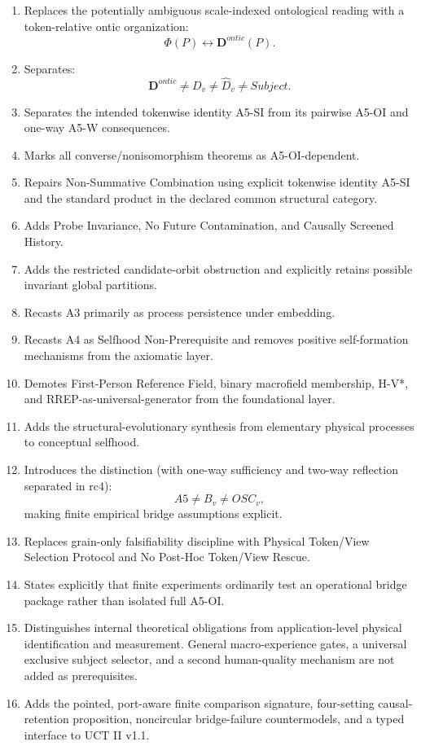 \documentclass[
  11pt,
  a4paper,
]{article}
\begin{document}
\begin{enumerate}
\def\labelenumi{\arabic{enumi}.}
\item
  Replaces the potentially ambiguous scale-indexed ontological reading
  with a token-relative ontic organization: \[
  \Phi(P)\leftrightarrow\mathbf D^{ontic}(P).
  \]
\item
  Separates: \[
  \mathbf D^{ontic}
  \neq
  D_v
  \neq
  \widehat D_v
  \neq
  Subject.
  \]
\item
  Separates the intended tokenwise identity A5-SI from its pairwise
  A5-OI and one-way A5-W consequences.
\item
  Marks all converse/nonisomorphism theorems as A5-OI-dependent.
\item
  Repairs Non-Summative Combination using explicit tokenwise identity
  A5-SI and the standard product in the declared common structural
  category.
\item
  Adds Probe Invariance, No Future Contamination, and Causally Screened
  History.
\item
  Adds the restricted candidate-orbit obstruction and explicitly retains
  possible invariant global partitions.
\item
  Recasts A3 primarily as process persistence under embedding.
\item
  Recasts A4 as Selfhood Non-Prerequisite and removes positive
  self-formation mechanisms from the axiomatic layer.
\item
  Demotes First-Person Reference Field, binary macrofield membership,
  H-V*, and RREP-as-universal-generator from the foundational layer.
\item
  Adds the structural-evolutionary synthesis from elementary physical
  processes to conceptual selfhood.
\item
  Introduces the distinction (with one-way sufficiency and two-way
  reflection separated in rc4): \[
  A5
  \neq
  B_v
  \neq
  OSC_v,
  \] making finite empirical bridge assumptions explicit.
\item
  Replaces grain-only falsifiability discipline with Physical Token/View
  Selection Protocol and No Post-Hoc Token/View Rescue.
\item
  States explicitly that finite experiments ordinarily test an
  operational bridge package rather than isolated full A5-OI.
\item
  Distinguishes internal theoretical obligations from application-level
  physical identification and measurement. General macro-experience
  gates, a universal exclusive subject selector, and a second
  human-quality mechanism are not added as prerequisites.
\item
  Adds the pointed, port-aware finite comparison signature, four-setting
  causal-retention proposition, noncircular bridge-failure
  countermodels, and a typed interface to UCT II v1.1.
\end{enumerate}
\end{document}
